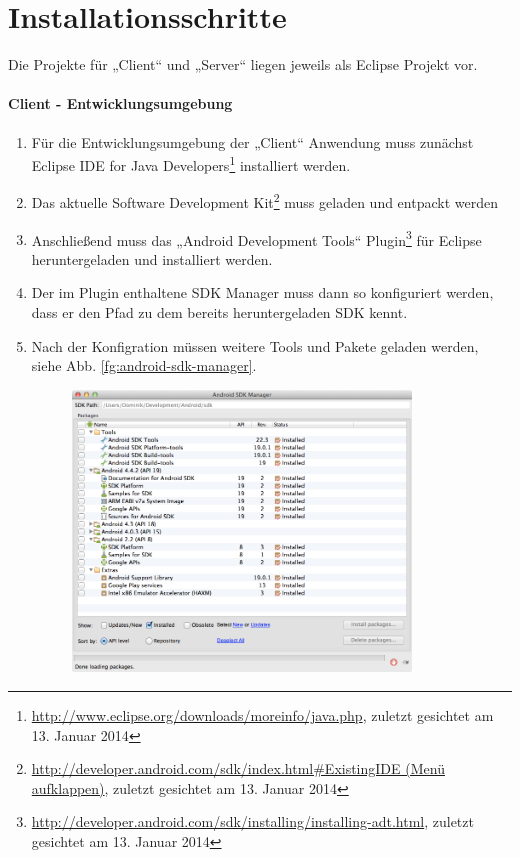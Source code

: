 
\section{Installationsschritte}

Die Projekte für „Client“ und „Server“ liegen jeweils als Eclipse Projekt vor.\\

\paragraph{Client - Entwicklungsumgebung}

\begin{enumerate}
	\item Für die Entwicklungsumgebung der „Client“ Anwendung muss zunächst Eclipse IDE for Java Developers\footnote{\url{http://www.eclipse.org/downloads/moreinfo/java.php}, zuletzt gesichtet am 13. Januar 2014} installiert werden.
	\item Das aktuelle Software Development Kit\footnote{\url{http://developer.android.com/sdk/index.html\#ExistingIDE (Menü aufklappen)}, zuletzt gesichtet am 13. Januar 2014} muss geladen und entpackt werden
	\item Anschließend muss das „Android Development Tools“ Plugin\footnote{\url{http://developer.android.com/sdk/installing/installing-adt.html}, zuletzt gesichtet am 13. Januar 2014} für Eclipse heruntergeladen und installiert werden.
	\item Der im Plugin enthaltene SDK Manager muss dann so konfiguriert werden, dass er den Pfad zu dem bereits heruntergeladen SDK kennt.
	\item Nach der Konfigration müssen weitere Tools und Pakete geladen werden, siehe Abb. \ref{fg:android-sdk-manager}.
	\begin{figure}[H]
		\centering
		\includegraphics[width=0.85\textwidth]{./images/install/android-sdk-manager.png}

\end{figure}
\end{enumerate}
